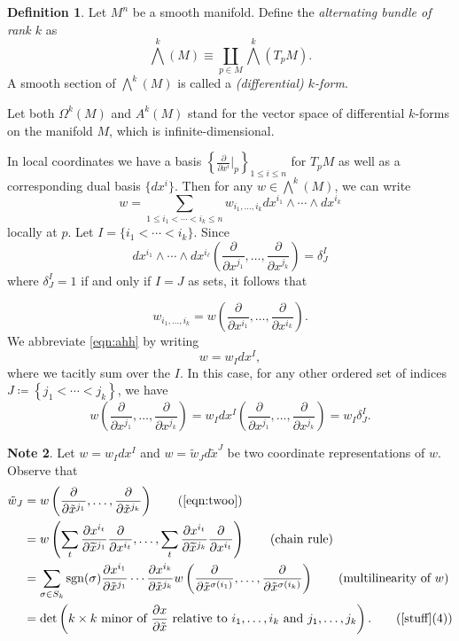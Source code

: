 \documentclass[10pt,letterpaper,cm]{nupset}
\theoremstyle{definition}
\newtheorem{definition}{Definition}[subsection]
\newtheorem{note}[definition]{Note}
\theoremstyle{theorem}
\theoremstyle{remark}
\newcommand{\1}{\mathbf{1}}
\newcommand{\0}{\vec 0}
\DeclareMathOperator{\sgn}{sgn}
\begin{document}
\begin{definition}
Let $M^n$ be a smooth manifold. Define the \textit{alternating bundle of rank $k$} as $$\bigwedge^k(M) \equiv \coprod_{p\in M} \bigwedge^k(T_pM).  $$ 
A smooth section of $\bigwedge^k(M)$ is called a \textit{(differential) $k$-form}.
\end{definition}

Let both $\Omega^k(M)$ and $A^k(M)$ stand for the vector space of differential $k$-forms on the manifold $M$, which  is infinite-dimensional. 


\medskip

In local coordinates we have a basis $\left\{\frac{\partial}{\partial{x^i}}\bigr\rvert_p\right\}_{1\leq i \leq n}$ for $T_pM$ as well as a corresponding dual basis $\{dx^i\}$. Then for any $w \in \bigwedge^k(M)$, we can write 
\[ \label{eqn:ahh}
 w = \sum_{1\leq i_1 < \cdots < i_k \leq n}w_{i_1, \ldots, i_k} dx^{i_1} \wedge \cdots \wedge dx^{i_k} 
 \tag{1}
 \] locally at $p$. Let $I =  \{i_1 < \cdots < i_k\}$. Since $$dx^{i_1} \wedge \cdots \wedge dx^{i_{\ell}}\left( \frac{\partial}{\partial{x^{j_1}}}, \ldots, \frac{\partial}{\partial{x^{j_k}}} \right) = \delta^I_J$$ where $\delta^I_J = 1$ if and only if $I = J$ as sets, it follows that

\[
\label{eqn:twoo}
w_{i_1, \ldots, i_k}  = w\left(\frac{\partial}{\partial{x^{i_1}}}, \ldots, \frac{\partial}{\partial{x^{i_k}}}\right).
\tag{2} \] We abbreviate \eqref{eqn:ahh} by writing $$w = w_I dx^I,$$ where we tacitly sum over the $I$. In this case, for any other ordered set of indices $J \coloneqq \left\{j_1< \cdots < j_k\right\}$, we have 
\[
w\left(\frac{\partial}{\partial x^{j_{1}}}, \dots, \frac{\partial}{\partial x^{j_{k}}}\right)=w_{I} d x^{I}\left(\frac{\partial}{\partial x^{j_{1}}}, \dots, \frac{\partial}{\partial x^{j_{k}}}\right) = w_I{\delta_J^I}.
\]


\begin{note}
Let $w = w_Idx^I$ and $ w= \tilde{w}_J d\tilde{x}^J$ be two coordinate representations of $w$.  Observe that 
\begin{align*}
\tilde{w}_J & = w\left(\frac{\partial}{\partial{\tilde{x}^{j_1}}}, \ldots,  \frac{\partial}{\partial{\tilde{x}^{j_k}}}\right)  \tag{\eqref{eqn:twoo}}
\\ & = w\left(\sum_{t} \frac{\partial x^{i_t}}{\partial \widetilde{x}^{j_{1}}} \frac{\partial}{\partial x^{i_t}}, \ldots, \sum_{t} \frac{\partial x^{i_t}}{\partial \widetilde{x}^{j_{k}}} \frac{\partial}{\partial x^{i_t}}\right) \tag{\text{chain rule}}
\\ & = \sum_{\sigma\in S_k}\sgn(\sigma)\frac{\partial{x^{i_1}}}{\partial{\tilde{x}^{j_1}}}\cdots \frac{\partial{x^{i_k}}}{\partial{\tilde{x}^{j_k}}}w\left(\frac{\partial}{\partial{\tilde{x}^{\sigma(i_1)}}}, \ldots, \frac{\partial}{\partial{\tilde{x}^{\sigma(i_k)}}} \right)  \tag{\text{multilinearity} of $w$}
\\ & =  \det\left(k \times k \text{ minor of }\frac{\partial{x}}{\partial{\tilde{x}}} \text{ relative to } i_1, \ldots, i_k \text{ and }j_1, \ldots, j_k\right). \tag{\cref{stuff}(4)}
\end{align*}
\end{note} 
\end{document}
